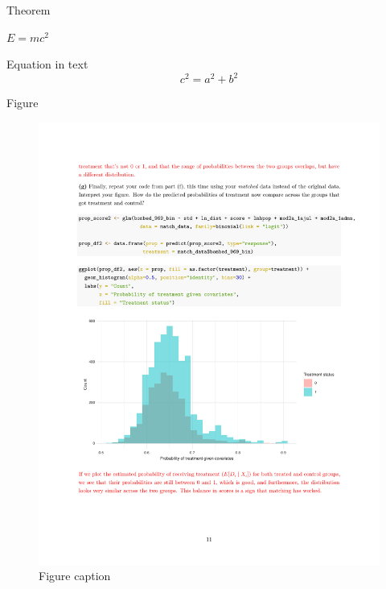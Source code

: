 \documentclass[aspectratio=169,xcolor=dvipsnames, t]{beamer}
\begin{document}
\begin{frame}{Theorem}
    \begin{theorem}
        $E = mc^2$
    \end{theorem}
    Equation in text
    \begin{equation}
        c^{2} = a^{2} + b^{2}
    \end{equation}
\end{frame}

\begin{frame}{Figure}
    \begin{figure}
    \includegraphics[height=0.5\paperheight]{figures/results_fig.pdf}
    \caption{Figure caption}
    \end{figure}
\end{frame}
\end{document}
